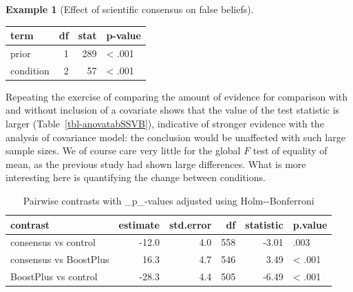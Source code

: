 \documentclass[
  11pt,
  letterpaper,
]{scrbook}
\theoremstyle{definition}
\newtheorem{example}{Example}[chapter]
\theoremstyle{remark}
\begin{document}
\begin{example}[Effect of scientific consensus on false
beliefs]
\begin{table}
\begin{minipage}[t]{\linewidth}
{}

\end{minipage}%
\newline
\begin{minipage}[t]{\linewidth}

{\centering 

\centering
\begin{tabular}[t]{lrrl}
\toprule
term & df & stat & p-value\\
\midrule
prior & 1 & 289 & < .001\\
condition & 2 & 57 & < .001\\
\bottomrule
\end{tabular}

}

\end{minipage}%

\end{table}

Repeating the exercise of comparing the amount of evidence for
comparison with and without inclusion of a covariate shows that the
value of the test statistic is larger (Table~\ref{tbl-anovatabSSVB}),
indicative of stronger evidence with the analysis of covariance model:
the conclusion would be unaffected with such large sample sizes. We of
course care very little for the global \(F\) test of equality of mean,
as the previous study had shown large differences. What is more
interesting here is quantifying the change between conditions.

\begin{table}

\caption{\label{tbl-contraststabSSVB}Pairwise contrasts with
\_p\_-values adjusted using
Holm-\/-Bonferroni}\begin{minipage}[t]{\linewidth}

{\centering 

\centering
\begin{tabular}[t]{lrrrrl}
\toprule
contrast & estimate & std.error & df & statistic & p.value\\
\midrule
consensus vs control & -12.0 & 4.0 & 558 & -3.01 & .003\\
consensus vs BoostPlus & 16.3 & 4.7 & 546 & 3.49 & < .001\\
BoostPlus vs control & -28.3 & 4.4 & 505 & -6.49 & < .001\\
\bottomrule
\end{tabular}

}
\end{minipage}
\end{table}
\end{example}
\end{document}
